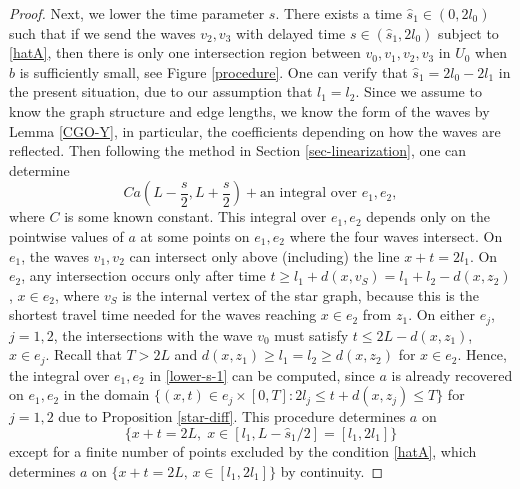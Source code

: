 \documentclass[10pt,a4paper]{amsart}
\begin{document}
\begin{proof}
Next, we lower the time parameter $s$. There exists a time $\hat{s}_1 \in (0,2l_0)$ such that if we send the waves $v_2,v_3$ with delayed time $s\in (\hat{s}_1,2l_0)$ subject to \eqref{hatA},
then there is only one intersection region between $v_0,v_1,v_2,v_3$ in $U_0$ when $b$ is sufficiently small, see Figure \ref{procedure}.
One can verify that $\hat{s}_1=2l_0-2l_1$ in the present situation, due to our assumption that $l_1=l_2$.
Since we assume to know the graph structure and edge lengths, we know the form of the waves by Lemma \ref{CGO-Y}, in particular, the coefficients depending on how the waves are reflected.
Then following the method in Section \ref{sec-linearization}, one can determine
\begin{equation} \label{lower-s-1}
C  a(L-\frac{s}{2},L+\frac{s}{2}) + \textrm{an integral over }e_1,e_2,
\end{equation}
where $C$ is some known constant. 
This integral over $e_1,e_2$ depends only on the pointwise values of $a$ at some points on $e_1,e_2$ where the four waves intersect.
On $e_1$, the waves $v_1,v_2$ can intersect only above (including) the line $x+t=2l_1$.
On $e_2$, any intersection occurs only after time $t\geq l_1+d(x,v_S)=l_1+l_2-d(x,z_2)$, $x\in e_2$, where $v_S$ is the internal vertex of the star graph,
because this is the shortest travel time needed for the waves reaching $x\in e_2$ from $z_1$.
On either $e_j$, $j=1,2$, the intersections with the wave $v_0$ must satisfy $t\leq 2L-d(x,z_1)$, $x\in e_j$.
Recall that $T>2L$ and $d(x,z_1)\geq l_1=l_2\geq d(x,z_2)$ for $x\in e_2$.
Hence, the integral over $e_1,e_2$ in \eqref{lower-s-1} can be computed, since
$a$ is already recovered on $e_1,e_2$ in the domain $\{(x,t)\in e_j\times [0,T]: 2l_j\leq t+d(x,z_j)\leq T\}$ for $j=1,2$ due to Proposition \ref{star-diff}.
This procedure determines $a$ on 
$$\big\{x+t=2L, \; x\in [l_1, L-\hat{s}_1/2]=[l_1,2l_1]\big\}$$ 
except for a finite number of points excluded by the condition \eqref{hatA}, which determines $a$ on $\{x+t=2L,\, x\in [l_1, 2l_1]\}$ by continuity. 


\end{proof}
\end{document}
